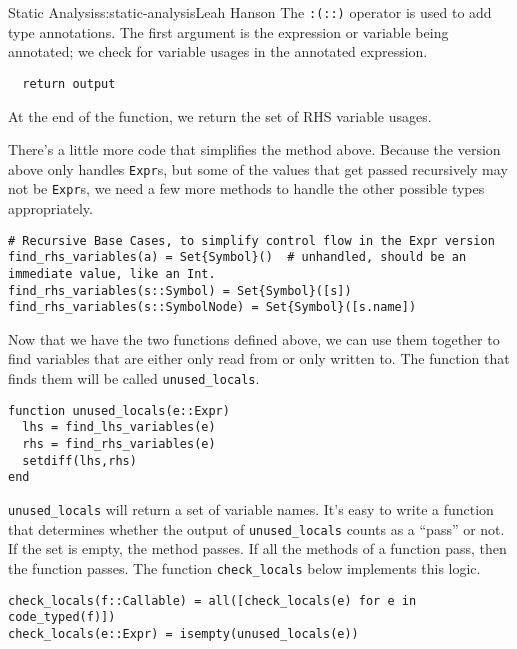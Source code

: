 \begin{aosachapter}{Static Analysis}{s:static-analysis}{Leah Hanson}
The \texttt{:(::)} operator is used to add type annotations. The first
argument is the expression or variable being annotated; we check for
variable usages in the annotated expression.

\begin{verbatim}
  return output
\end{verbatim}

At the end of the function, we return the set of RHS variable usages.

There's a little more code that simplifies the method above. Because the
version above only handles \texttt{Expr}s, but some of the values that
get passed recursively may not be \texttt{Expr}s, we need a few more
methods to handle the other possible types appropriately.

\begin{verbatim}
# Recursive Base Cases, to simplify control flow in the Expr version
find_rhs_variables(a) = Set{Symbol}()  # unhandled, should be an immediate value, like an Int.
find_rhs_variables(s::Symbol) = Set{Symbol}([s])
find_rhs_variables(s::SymbolNode) = Set{Symbol}([s.name])
\end{verbatim}

\label{putting-it-together}

Now that we have the two functions defined above, we can use them
together to find variables that are either only read from or only
written to. The function that finds them will be called
\texttt{unused\_locals}.

\begin{verbatim}
function unused_locals(e::Expr)
  lhs = find_lhs_variables(e)
  rhs = find_rhs_variables(e)
  setdiff(lhs,rhs)
end
\end{verbatim}

\texttt{unused\_locals} will return a set of variable names. It's easy
to write a function that determines whether the output of
\texttt{unused\_locals} counts as a ``pass'' or not. If the set is
empty, the method passes. If all the methods of a function pass, then
the function passes. The function \texttt{check\_locals} below
implements this logic.

\begin{verbatim}
check_locals(f::Callable) = all([check_locals(e) for e in code_typed(f)])
check_locals(e::Expr) = isempty(unused_locals(e))
\end{verbatim}

\label{conclusion}


\end{aosachapter}
